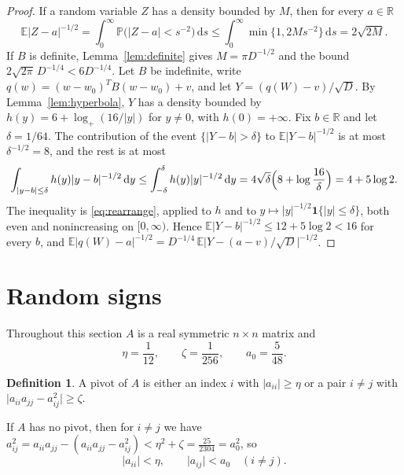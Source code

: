 \documentclass[11pt]{amsart}
\numberwithin{equation}{section}
\theoremstyle{definition}
\newtheorem{definition}[theorem]{Definition}
\theoremstyle{remark}
\newcommand{\R}{\mathbb R}
\newcommand{\E}{\mathbb E}
\newcommand{\PP}{\mathbb P}
\newcommand{\1}{\mathbf 1}
\newcommand{\dd}{\,\mathrm d}
\newcommand{\logp}{\log_+}
\newcommand{\abs}[1]{\lvert #1\rvert}
\begin{document}
\begin{proof}
If a random variable $Z$ has a density bounded by $M$, then for every $a\in\R$
\begin{equation}\label{eq:boundedhalf}
\E\abs{Z-a}^{-1/2}=\int_0^\infty\PP\bigl(\abs{Z-a}<s^{-2}\bigr)\dd s\le\int_0^\infty\min\{1,2Ms^{-2}\}\dd s=2\sqrt{2M}.
\end{equation}
If $B$ is definite, Lemma~\ref{lem:definite} gives $M=\pi D^{-1/2}$ and the bound $2\sqrt{2\pi}\,D^{-1/4}<6D^{-1/4}$. Let $B$ be indefinite, write $q(w)=(w-w_0)^TB(w-w_0)+v$, and let $Y=(q(W)-v)/\sqrt D$. By Lemma~\ref{lem:hyperbola}, $Y$ has a density bounded by $h(y)=6+\logp(16/\abs y)$ for $y\ne0$, with $h(0)=+\infty$. Fix $b\in\R$ and let $\delta=1/64$. The contribution of the event $\{\abs{Y-b}>\delta\}$ to $\E\abs{Y-b}^{-1/2}$ is at most $\delta^{-1/2}=8$, and the rest is at most
\[
\int_{\abs{y-b}\le\delta}h(y)\abs{y-b}^{-1/2}\dd y\le\int_{-\delta}^\delta h(y)\abs y^{-1/2}\dd y=4\sqrt\delta\Bigl(8+\log\frac{16}\delta\Bigr)=4+5\log2 .
\]
The inequality is \eqref{eq:rearrange}, applied to $h$ and to $y\mapsto\abs y^{-1/2}\1\{\abs y\le\delta\}$, both even and nonincreasing on $[0,\infty)$. Hence $\E\abs{Y-b}^{-1/2}\le12+5\log2<16$ for every $b$, and $\E\abs{q(W)-a}^{-1/2}=D^{-1/4}\,\E\abs{Y-(a-v)/\sqrt D}^{-1/2}$.
\end{proof}


\section{Random signs}\label{sec:signs}

Throughout this section $A$ is a real symmetric $n\times n$ matrix and
\begin{equation}\label{eq:parameters}
\eta=\frac1{12},\qquad\zeta=\frac1{256},\qquad a_0=\frac5{48}.
\end{equation}

\begin{definition}\label{def:pivot}
A pivot of $A$ is either an index $i$ with $\abs{a_{ii}}\ge\eta$ or a pair $i\ne j$ with $\abs{a_{ii}a_{jj}-a_{ij}^2}\ge\zeta$.
\end{definition}

If $A$ has no pivot, then for $i\ne j$ we have $a_{ij}^2=a_{ii}a_{jj}-(a_{ii}a_{jj}-a_{ij}^2)<\eta^2+\zeta=\frac{25}{2304}=a_0^2$, so
\begin{equation}\label{eq:small}
\abs{a_{ii}}<\eta,\qquad\abs{a_{ij}}<a_0\quad(i\ne j).
\end{equation}
\end{document}
